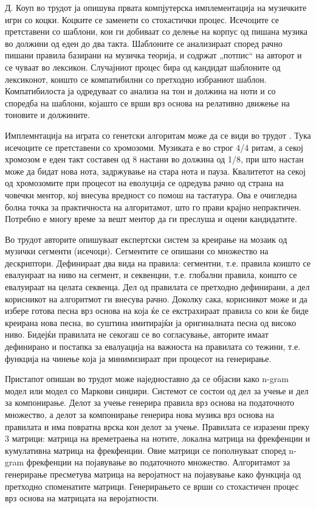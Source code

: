 Д. Коуп во трудот \cite{Cope1991} ја опишува првата компјутерска имплементација на музичките игри со коцки. Коцките се заменети со стохастички процес. Исечоците се претставени со шаблони, кои ги добиваат со делење на корпус од пишана музика во должини од еден до два такта. Шаблоните се анализираат според рачно пишани правила базирани на музичка теорија, и содржат „потпис“ на авторот и се чуваат во лексикон. Случајниот процес бира од кандидат шаблоните од лексиконот, коишто се компатибилни со претходно избраниот шаблон. Компатибилоста ја одредуваат со анализа на тон и должина на ноти и со споредба на шаблони, којашто се врши врз основа на релативно движење на тоновите и должините.

Имплемнтација на играта со генетски алгоритам може да се види во трудот \cite{Biles1994}. Тука исечоците се претставени со хромозоми. Музиката е во строг 4/4 ритам, а секој хромозом е еден такт составен од 8 настани во должина од 1/8, при што настан може да бидат нова нота, задржување на стара нота и пауза. Квалитетот на секој од хромозомите при процесот на еволуција се одредува рачно од страна на човечки ментор, кој внесува вредност со помош на тастатура. Ова е очигледна болна точка за практичноста на алгоритамот, што го прави крајно непрактичен. Потребно е многу време за вешт ментор да ги преслуша и оцени кандидатите. 

Во трудот \cite{Zils2001} авторите опишуваат експертски систем за креирање на мозаик од музички сегменти (исечоци). Сегментите се опишани со множество на дескриптори. Дефинираат два вида на правила: сегментни, т.е. правила коишто се евалуираат на ниво на сегмент, и секвенцни, т.е. глобални правила, коишто се евалуираат на целата секвенца. Дел од правилата се претходно дефинирани, а дел корисникот на алгоритмот ги внесува рачно. Доколку сака, корисникот може и да избере готова песна врз основа на која ќе се екстрахираат правила со кои ќе биде креирана нова песна, во суштина имитирајќи ја оригиналната песна од високо ниво. Бидејќи правилата не секогаш се во согласување, авторите имаат дефинирано и постапка за евалуација на важноста на правилата со тежини, т.е. функција на чинење која ја минимизираат при процесот на генерирање.

Пристапот опишан во трудот \cite{GarciaSalas2011} може наједноставно да се објасни како n-gram модел или модел со Маркови синџири. Системот се состои од дел за учење и дел за компонирање. Делот за учење генерира правила врз основа на податочното множество, а делот за компонирање генерира нова музика врз основа на правилата и има повратна врска кон делот за учење. Правилата се изразени преку 3 матрици: матрица на времетраења на нотите, локална матрица на фрекфенции и кумулативна матрица на фрекфенции. Овие матрици се пополнуваат според n-gram фрекфенции на појавување во податочното множество. Алгоритамот за генерирање пресметува матрица на веројатност на појавување како функција од претходно споменатите матрици. Генерирањето се врши со стохастичен процес врз основа на матрицата на веројатности. 

